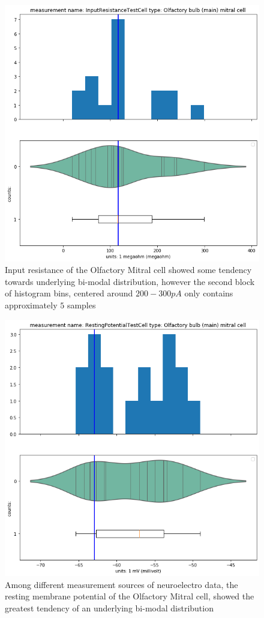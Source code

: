     \begin{center}
   \begin{figure}   
   \includegraphics[width=0.7\linewidth]{notebooks_converted/needata_thesis_files/needata_thesis_5_21}
         \caption{Input resistance of the Olfactory Mitral cell showed some tendency towards underlying bi-modal distribution, however the second block of histogram bins, centered around $200-300pA$ only contains approximately $5$ samples}
   \end{figure}
   \end{center}
   
    \begin{center}     
      \begin{figure}  
  \includegraphics[width=0.7\linewidth]{notebooks_converted/needata_thesis_files/needata_thesis_5_22}
      \caption{Among different measurement sources of neuroelectro data, the resting membrane potential of the Olfactory Mitral cell, showed the greatest tendency of an underlying bi-modal distribution}
      \end{figure}
      \end{center}     

